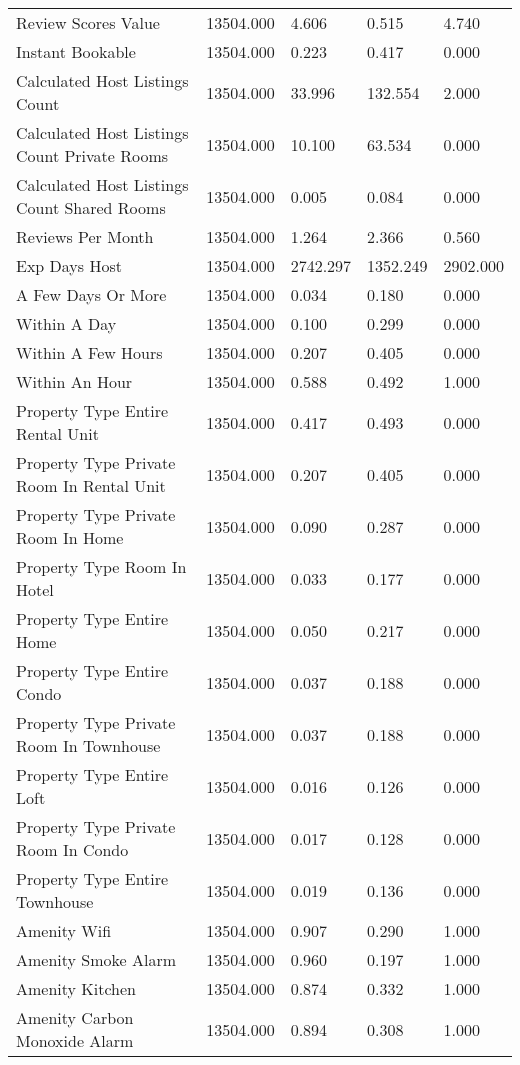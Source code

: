 \begin{tabular}{lllll}
Review Scores Value & 13504.000 & 4.606 & 0.515 & 4.740 \\
Instant Bookable & 13504.000 & 0.223 & 0.417 & 0.000 \\
Calculated Host Listings Count & 13504.000 & 33.996 & 132.554 & 2.000 \\
Calculated Host Listings Count Private Rooms & 13504.000 & 10.100 & 63.534 & 0.000 \\
Calculated Host Listings Count Shared Rooms & 13504.000 & 0.005 & 0.084 & 0.000 \\
Reviews Per Month & 13504.000 & 1.264 & 2.366 & 0.560 \\
Exp Days Host & 13504.000 & 2742.297 & 1352.249 & 2902.000 \\
A Few Days Or More & 13504.000 & 0.034 & 0.180 & 0.000 \\
Within A Day & 13504.000 & 0.100 & 0.299 & 0.000 \\
Within A Few Hours & 13504.000 & 0.207 & 0.405 & 0.000 \\
Within An Hour & 13504.000 & 0.588 & 0.492 & 1.000 \\
Property Type Entire Rental Unit & 13504.000 & 0.417 & 0.493 & 0.000 \\
Property Type Private Room In Rental Unit & 13504.000 & 0.207 & 0.405 & 0.000 \\
Property Type Private Room In Home & 13504.000 & 0.090 & 0.287 & 0.000 \\
Property Type Room In Hotel & 13504.000 & 0.033 & 0.177 & 0.000 \\
Property Type Entire Home & 13504.000 & 0.050 & 0.217 & 0.000 \\
Property Type Entire Condo & 13504.000 & 0.037 & 0.188 & 0.000 \\
Property Type Private Room In Townhouse & 13504.000 & 0.037 & 0.188 & 0.000 \\
Property Type Entire Loft & 13504.000 & 0.016 & 0.126 & 0.000 \\
Property Type Private Room In Condo & 13504.000 & 0.017 & 0.128 & 0.000 \\
Property Type Entire Townhouse & 13504.000 & 0.019 & 0.136 & 0.000 \\
Amenity Wifi & 13504.000 & 0.907 & 0.290 & 1.000 \\
Amenity Smoke Alarm & 13504.000 & 0.960 & 0.197 & 1.000 \\
Amenity Kitchen & 13504.000 & 0.874 & 0.332 & 1.000 \\
Amenity Carbon Monoxide Alarm & 13504.000 & 0.894 & 0.308 & 1.000 \\

\end{tabular}
